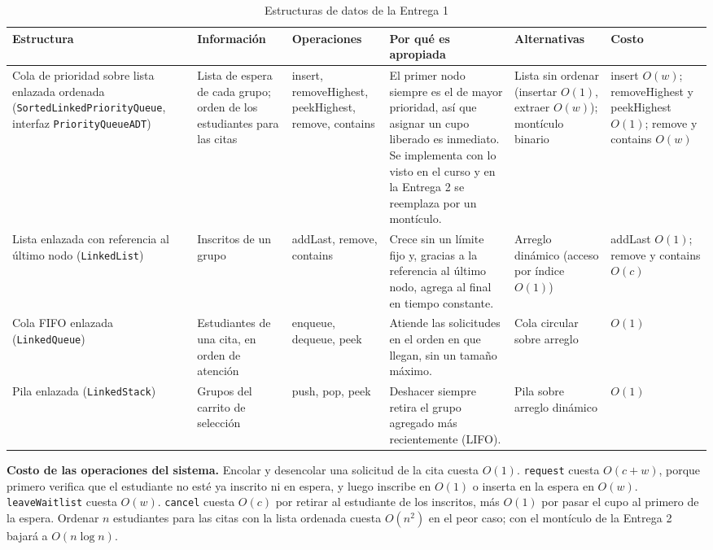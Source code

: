 \documentclass[conference]{IEEEtran}
\begin{document}
\begin{table}[htbp]
\caption{Estructuras de datos de la Entrega 1}
\label{tab:ed}
\centering
\footnotesize
\setlength{\tabcolsep}{3pt}
\begin{tabular}{@{}p{2.6cm} p{2.6cm} p{2.3cm} p{4.3cm} p{2.8cm} p{2.4cm}@{}}
\toprule
\textbf{Estructura} & \textbf{Información} & \textbf{Operaciones} & \textbf{Por qué es apropiada} & \textbf{Alternativas} & \textbf{Costo} \\
\midrule
Cola de prioridad sobre lista enlazada ordenada (\texttt{SortedLinked}\allowbreak\texttt{PriorityQueue}, interfaz \texttt{PriorityQueueADT}) & Lista de espera de cada grupo; orden de los estudiantes para las citas & insert, removeHighest, peekHighest, remove, contains & El primer nodo siempre es el de mayor prioridad, así que asignar un cupo liberado es inmediato. Se implementa con lo visto en el curso y en la Entrega 2 se reemplaza por un montículo. & Lista sin ordenar (insertar $O(1)$, extraer $O(w)$); montículo binario & insert $O(w)$; removeHighest y peekHighest $O(1)$; remove y contains $O(w)$ \\
Lista enlazada con referencia al último nodo (\texttt{LinkedList}) & Inscritos de un grupo & addLast, remove, contains & Crece sin un límite fijo y, gracias a la referencia al último nodo, agrega al final en tiempo constante. & Arreglo dinámico (acceso por índice $O(1)$) & addLast $O(1)$; remove y contains $O(c)$ \\
Cola FIFO enlazada (\texttt{LinkedQueue}) & Estudiantes de una cita, en orden de atención & enqueue, dequeue, peek & Atiende las solicitudes en el orden en que llegan, sin un tamaño máximo. & Cola circular sobre arreglo & $O(1)$ \\
Pila enlazada (\texttt{LinkedStack}) & Grupos del carrito de selección & push, pop, peek & Deshacer siempre retira el grupo agregado más recientemente (LIFO). & Pila sobre arreglo dinámico & $O(1)$ \\
\bottomrule
\end{tabular}
\end{table}

\textbf{Costo de las operaciones del sistema.} Encolar y desencolar una solicitud de la cita cuesta $O(1)$. \texttt{request} cuesta $O(c + w)$, porque primero verifica que el estudiante no esté ya inscrito ni en espera, y luego inscribe en $O(1)$ o inserta en la espera en $O(w)$. \texttt{leaveWaitlist} cuesta $O(w)$. \texttt{cancel} cuesta $O(c)$ por retirar al estudiante de los inscritos, más $O(1)$ por pasar el cupo al primero de la espera. Ordenar $n$ estudiantes para las citas con la lista ordenada cuesta $O(n^2)$ en el peor caso; con el montículo de la Entrega 2 bajará a $O(n \log n)$.
\end{document}
